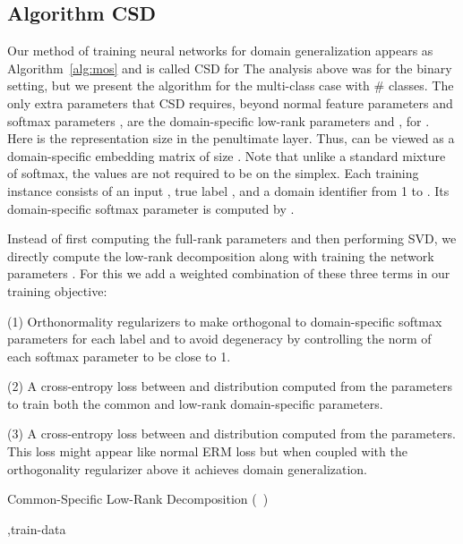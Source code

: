 \documentclass{article}
\begin{document}
\subsection{Algorithm CSD}
Our method of training neural networks for domain generalization appears as Algorithm~\ref{alg:mos} and is called CSD for \mosdescr  The analysis above was for the binary setting, but we present the algorithm for the multi-class case with   \# classes.
The only extra parameters that CSD requires, beyond normal feature parameters  and softmax parameters , are the domain-specific low-rank parameters   and , for . Here  is the representation size in the penultimate layer. Thus,  can be viewed as a domain-specific embedding matrix of size .  Note that unlike a standard mixture of softmax, the  values are not required to be on the simplex.  
Each training instance consists of an input , true label , and a domain identifier  from 1 to .  Its domain-specific softmax parameter is computed by .

Instead of first computing the full-rank parameters and then performing SVD, we directly compute the low-rank decomposition along with training the network parameters .  For this we add a weighted combination of these three terms in our training objective:

(1) Orthonormality regularizers to make  orthogonal to domain-specific  softmax parameters for each label  and to avoid degeneracy by  controlling the norm of each softmax parameter to be close to 1.
    
    (2) A cross-entropy loss between  and distribution computed from the  parameters to train both the common and low-rank domain-specific parameters.
    
    (3) A cross-entropy loss between  and distribution computed from the  parameters. This loss might appear like normal ERM loss but when coupled with the orthogonality regularizer above it achieves domain generalization.



















\begin{algorithm}
\caption{Common-Specific Low-Rank Decomposition (\mos\ ) }
\label{alg:mos}
\begin{algorithmic}[1]
 ,train-data
\State{}
\State{} 


   \State{}
\EndFor

  \end{algorithmic}
\end{algorithm}
\end{document}
